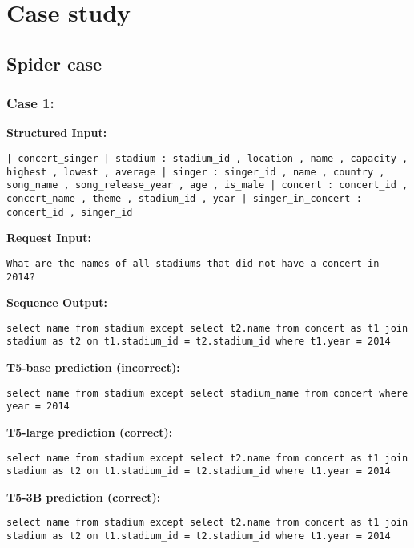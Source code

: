 \documentclass[11pt]{article}
\begin{document}
\section{Case study}
\label{app:case-study}
\subsection{Spider case}
\subsubsection{Case 1:}
\textbf{Structured Input:} 
\begin{lstlisting}
| concert_singer | stadium : stadium_id , location , name , capacity , highest , lowest , average | singer : singer_id , name , country , song_name , song_release_year , age , is_male | concert : concert_id , concert_name , theme , stadium_id , year | singer_in_concert : concert_id , singer_id
\end{lstlisting}
\textbf{Request Input:} 
\begin{lstlisting}
What are the names of all stadiums that did not have a concert in 2014?
\end{lstlisting}
\textbf{Sequence Output:} 
\begin{lstlisting}
select name from stadium except select t2.name from concert as t1 join stadium as t2 on t1.stadium_id = t2.stadium_id where t1.year = 2014
\end{lstlisting}
\textbf{T5-base prediction (incorrect):} 
\begin{lstlisting}
select name from stadium except select stadium_name from concert where year = 2014
\end{lstlisting}
\textbf{T5-large prediction (correct):} 
\begin{lstlisting}
select name from stadium except select t2.name from concert as t1 join stadium as t2 on t1.stadium_id = t2.stadium_id where t1.year = 2014
\end{lstlisting}
\textbf{T5-3B prediction (correct):} 
\begin{lstlisting}
select name from stadium except select t2.name from concert as t1 join stadium as t2 on t1.stadium_id = t2.stadium_id where t1.year = 2014
\end{lstlisting}
\end{document}
